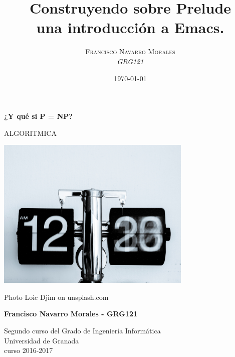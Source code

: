 \documentclass[a4paper, 11pt]{article}
\title{\textbf{Construyendo sobre Prelude}\\ %
					una introducción a Emacs.} %
\author{\textsc{Francisco Navarro Morales} %
\\{\textit{GRG121}}} %
\date{\today} %
\makeatletter
\renewcommand{\maketitle}{
  \begin{flushright} %
  
  {\LARGE\@title} %
  
  \vspace{50pt} %
  
  {\large\@author} %
  \\\@date %
  \vspace{40pt} %
  \end{flushright}
}
\makeatother
\begin{document}
	
	
	\begin{titlepage}
		\begin{center}
			\vspace*{2cm}
			
			{\Huge \textbf{¿Y qué si P = NP?}}
			
			 ALGORITMICA 
			
			
			\vspace{0.5cm}
			
			
		    \centering \includegraphics[width=0.7\textwidth]{cover.jpg}
		    
		    
		    {\footnotesize Photo Loic Djim on unsplash.com}
			
			\vspace{2cm}
			
			\textbf{Francisco Navarro Morales - GRG121 }
			
			\vfill
			
			Segundo curso del Grado de Ingeniería Informática\\
			Universidad de Granada\\
			curso 2016-2017\\
			
		\end{center}
	\end{titlepage}



\renewcommand{\abstractname}{Resumen} %
\end{document}
